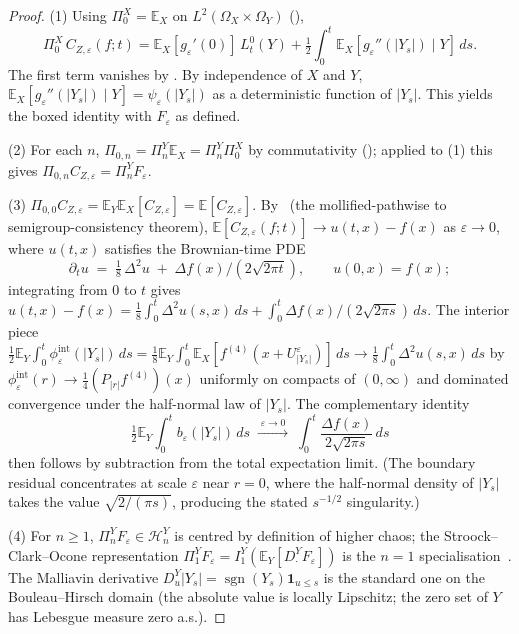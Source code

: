 \documentclass[11pt,reqno]{amsart}
\theoremstyle{plain}
\theoremstyle{definition}
\theoremstyle{remark}
\newcommand{\E}{\mathbb{E}}
\newcommand{\Hilb}{\mathcal{H}}
\newcommand{\IBM}{Z}
\newcommand{\Pir}{\Pi}
\DeclareMathOperator{\sgn}{sgn}
\begin{document}
\begin{proof}
(1) Using $\Pir_0^X=\E_X$ on $L^{2}(\Omega_X\times\Omega_Y)$
(),
\[
 \Pir_0^X\,C_{\IBM,\varepsilon}(f;t)
 =\E_X[g_\varepsilon'(0)]\,L_t^0(Y)
  +\tfrac12\!\int_0^t\!\E_X[g_\varepsilon''(|Y_s|)\mid Y]\,ds.
\]
The first term vanishes by . By independence of
$X$ and $Y$, $\E_X[g_\varepsilon''(|Y_s|)\mid Y]=\psi_\varepsilon(|Y_s|)$
as a deterministic function of $|Y_s|$. This yields the boxed
identity with $F_\varepsilon$ as defined.

(2) For each $n$, $\Pir_{0,n}=\Pir_n^Y\E_X=\Pir_n^Y\Pir_0^X$ by
commutativity (); applied to (1) this gives
$\Pir_{0,n}C_{\IBM,\varepsilon}=\Pir_n^Y F_\varepsilon$.

(3) $\Pir_{0,0}C_{\IBM,\varepsilon}=\E_Y\E_X[C_{\IBM,\varepsilon}]
=\E[C_{\IBM,\varepsilon}]$. By~\cite[Thm.\ 6.5]{Fontes-EnergyFirst}
(the mollified-pathwise to semigroup-consistency theorem),
$\E[C_{\IBM,\varepsilon}(f;t)]\to u(t,x)-f(x)$ as
$\varepsilon\to 0$, where $u(t,x)$ satisfies the Brownian-time PDE
\[
 \partial_t u\;=\;\tfrac18\,\Delta^2 u\;+\;\Delta f(x)/(2\sqrt{2\pi t}),
 \qquad u(0,x)=f(x);
\]
integrating from $0$ to $t$ gives
$u(t,x)-f(x)=\tfrac18\!\int_0^t\!\Delta^2u(s,x)\,ds
+\int_0^t\!\Delta f(x)/(2\sqrt{2\pi s})\,ds$. The interior piece
$\tfrac12\E_Y\!\int_0^t\phi_\varepsilon^{\mathrm{int}}(|Y_s|)\,ds
=\tfrac18\E_Y\!\int_0^t\E_X[f^{(4)}(x+U_{|Y_s|}^\varepsilon)]\,ds
\to\tfrac18\!\int_0^t\!\Delta^2 u(s,x)\,ds$ by $\phi_\varepsilon^{\mathrm{int}}(r)\to\tfrac14(P_{|r|}f^{(4)})(x)$
uniformly on compacts of $(0,\infty)$ and dominated convergence
under the half-normal law of $|Y_s|$. The complementary identity
\[
 \tfrac12\E_Y\!\int_0^t\!b_\varepsilon(|Y_s|)\,ds
 \;\xrightarrow{\;\varepsilon\to 0\;}\;
 \int_0^t\!\frac{\Delta f(x)}{2\sqrt{2\pi s}}\,ds
\]
then follows by subtraction from the total expectation limit. (The
boundary residual concentrates at scale $\varepsilon$ near $r=0$,
where the half-normal density of $|Y_s|$ takes the value
$\sqrt{2/(\pi s)}$, producing the stated $s^{-1/2}$ singularity.)

(4) For $n\ge 1$, $\Pir_n^Y F_\varepsilon\in\Hilb_n^Y$ is centred by
definition of higher chaos; the Stroock--Clark--Ocone representation
$\Pir_1^Y F_\varepsilon=I_1^Y(\E_Y[D^Y_\cdot F_\varepsilon])$ is the
$n=1$ specialisation~\cite{Nualart}. The Malliavin derivative
$D^Y_u|Y_s|=\sgn(Y_s)\mathbf 1_{u\le s}$ is the standard one on the
Bouleau--Hirsch domain (the absolute value is locally Lipschitz; the
zero set of $Y$ has Lebesgue measure zero a.s.).
\end{proof}
\end{document}
